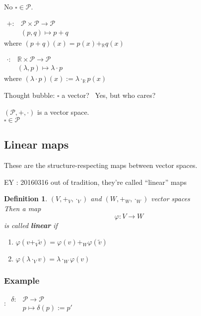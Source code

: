 \documentclass[10pt, twoside]{amsart}
\newtheorem{definition}{Definition}
\begin{document}
\begin{multicols*}{2}
No $\square \in \mathcal{P}$.

$\begin{aligned} +:  & \mathcal{P} \times \mathcal{P} \to \mathcal{P} \\
  & (p,q) \mapsto p+q \end{aligned}$  \\
where $(p+q)(x) = p(x) +_{\mathbb{R}} q(x)$

$\begin{aligned} 
  \cdot : & \mathbb{R} \times \mathcal{P} \to \mathcal{P} \\
  & (\lambda, p) \mapsto \lambda \cdot p \end{aligned}$ \\
where $(\lambda \cdot p)(x) := \lambda \cdot_{\mathbb{R}} p(x)$

Thought bubble: $\square$ a vector?  \qquad \, Yes, but who cares?

$(\mathcal{P}, + ,\cdot )$ is a vector space.   \\
$\square \in \mathcal{P}$

\subsection{Linear maps}

These are the structure-respecting maps between vector spaces.  

EY : 20160316 out of tradition, they're called ``linear'' maps

\begin{definition}
  $(V,+_V,\cdot_V)$ and $(W,+_W,\cdot_W)$ vector spaces \\
Then a map
\[
\varphi : V \to W 
\]
is called \textbf{linear} if 
\begin{enumerate}
  \item[(i)] $\varphi(v+_V \widetilde{v}) = \varphi(v) +_W \varphi(\widetilde{v}) $  
  \item[(ii)] $\varphi(\lambda \cdot_V v) = \lambda \cdot_W \varphi(v)$
\end{enumerate}
\end{definition}

\subsubsection*{Example}:
$\begin{aligned}
  \delta : & \mathcal{P} \to \mathcal{P}  \\
  & p \mapsto \delta(p) := p' \end{aligned}$


\end{multicols*}
\end{document}
